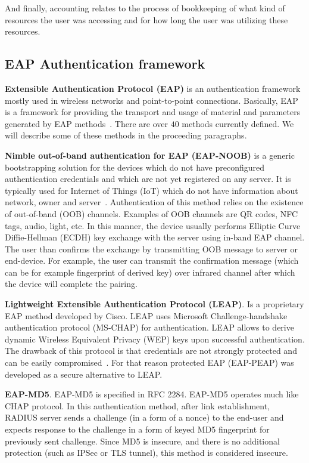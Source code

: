 And finally, accounting relates to the process of bookkeeping of what kind of resources the user was accessing and for how long the user was utilizing these resources.

\subsection{EAP Authentication framework}

\textbf{Extensible Authentication Protocol (EAP)} is an authentication framework mostly used in 
wireless networks and point-to-point connections. Basically, EAP is a framework for providing the 
transport and usage of material and parameters generated by EAP methods~\cite{wiki:EAP}.  There are over $40$
methods currently defined. We will describe some of these methods in the proceeding paragraphs.

\textbf{Nimble out-of-band authentication for EAP (EAP-NOOB)} is a generic bootstrapping solution for the devices which do not have preconfigured authentication credentials and which are not yet registered on any server. It is typically used for Internet of Things (IoT) which do not have information about network, owner and server~\cite{wiki:eapnoob}. Authentication of this method relies on the existence of out-of-band (OOB) channels. Examples of OOB channels are QR codes, NFC tags, audio, light, etc. In this manner, the device usually performs Elliptic Curve Diffie-Hellman (ECDH) key exchange with the server using in-band EAP channel. The user than confirms the exchange by transmitting OOB message to server or end-device. For example, the user can transmit the confirmation message (which can be for example fingerprint of derived key) over infrared channel after which the device will complete the pairing.

\textbf{Lightweight Extensible Authentication Protocol (LEAP)}. Is a proprietary EAP method developed by Cisco. LEAP uses Microsoft Challenge-handshake authentication protocol (MS-CHAP) for authentication. LEAP allows to derive dynamic Wireless Equivalent Privacy (WEP) keys upon successful authentication. The drawback of this protocol is that credentials are not strongly protected and can be easily compromised~\cite{}. For that reason protected EAP (EAP-PEAP) was developed as a secure alternative to LEAP.

\textbf{EAP-MD5}. EAP-MD5 is specified in RFC 2284. EAP-MD5 operates much like CHAP protocol. In this authentication method, after link establishment, RADIUS server sends a challenge (in a form of a nonce) to the end-user and expects response to the challenge in a form of keyed MD5 fingerprint for previously sent challenge. Since MD5 is insecure, and there is no additional protection (such as IPSec or TLS tunnel), this method is considered insecure.

